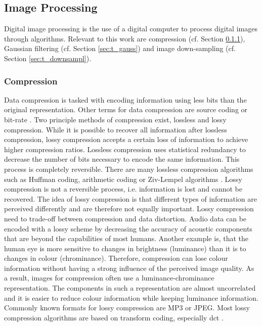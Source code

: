 \subsection{Image Processing}
Digital image processing is the use of a digital computer to process digital images through algorithms. Relevant to this work are compression (cf. Section \ref{sec:t_compress}), Gaussian filtering  (cf. Section \ref{sec:t_gauss}) and image down-sampling  (cf. Section \ref{sec:t_downsampl}).

\subsubsection{Compression} \label{sec:t_compress}
Data compression is tasked with encoding information using less bits than the original representation. Other terms for data compression are source coding or bit-rate \cite{mahdi2012implementing}. Two principle methods of compression exist, lossless and lossy compression. While it is possible to recover all information after lossless compression, lossy compression accepts a certain loss of information to achieve higher compression ratios.
Lossless compression uses statistical redundancy to decrease the number of bits necessary to encode the same information. This process is completely reversible. There are many lossless compression algorithms such as Huffman coding, arithmetic coding or Ziv-Lempel algorithms \cite{Bocharova2009CompressionMultimedia}.
Lossy compression is not a reversible process, i.e. information is lost and cannot be recovered. The idea of lossy compression is that different types of information are perceived differently and are therefore not equally important. Lossy compression need to trade-off between compression and data distortion. Audio data can be encoded with a lossy scheme by decreasing the accuracy of acoustic components that are beyond the capabilities of most humans. Another example is, that the human eye is more sensitive to changes in brightness (luminance) than it is to changes in colour (chrominance). Therefore, compression can lose colour information without having a strong influence of the perceived image quality. As a result, images for compression often use a luminance-chrominance representation. The components in such a representation are almost uncorrelated and it is easier to reduce colour information while keeping luminance information. Commonly known formats for lossy compression are MP3 or JPEG. Most lossy compression algorithms are based on transform coding, especially \gls{dct} \cite{Bocharova2009CompressionMultimedia}.

